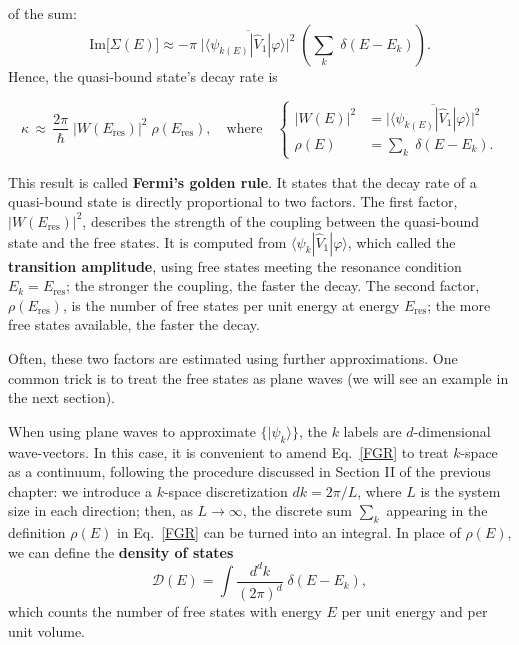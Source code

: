 \documentclass[pra,12pt]{revtex4}
\begin{document}
of the sum:
\begin{equation}
  \mathrm{Im}\big[\Sigma(E)\big]
  \approx - \pi \;
  \overline{\big| \langle\psi_{k(E)}| \hat{V}_1|\varphi\rangle\big|^2}
  \; \left( \sum_k \; \delta(E-E_k) \right).
  \label{fermigr2}
\end{equation}
Hence, the quasi-bound state's decay rate is
\begin{framed}
  \begin{equation}
    \kappa
    \,\approx\, \frac{2\pi}{\hbar} \;
    \big|W(E_\mathrm{res})\big|^2 \; \rho(E_{\mathrm{res}}),
    \quad \mathrm{where} \quad \left\{
    \begin{aligned}
      \big|W(E)\big|^2
      &= \overline{\Big| \langle\psi_{k(E)}| \hat{V}_1|\varphi\rangle\Big|^2} \\
      \rho(E) &= \sum_k \; \delta(E-E_k).
    \end{aligned}\right.
    \label{FGR}
  \end{equation}
\end{framed}
\vskip -0.12in
This result is called \textbf{Fermi's golden rule}.  It states that
the decay rate of a quasi-bound state is directly proportional to two
factors.  The first factor, $|W(E_\mathrm{res})|^2$, describes the
strength of the coupling between the quasi-bound state and the free
states.  It is computed from $\langle\psi_{k}|
\hat{V}_1|\varphi\rangle$, which called the \textbf{transition
  amplitude}, using free states meeting the resonance condition $E_k =
E_{\mathrm{res}}$; the stronger the coupling, the faster the decay.
The second factor, $\rho(E_{\mathrm{res}})$, is the number of free
states per unit energy at energy $E_{\mathrm{res}}$; the more free
states available, the faster the decay.

Often, these two factors are estimated using further approximations.
One common trick is to treat the free states as plane waves (we will
see an example in the next section).

When using plane waves to approximate $\{|\psi_k\rangle\}$, the $k$
labels are $d$-dimensional wave-vectors.  In this case, it is
convenient to amend Eq.~\eqref{FGR} to treat $k$-space as a continuum,
following the procedure discussed in Section II of the previous
chapter: we introduce a $k$-space discretization $dk = 2\pi/L$, where
$L$ is the system size in each direction; then, as $L\rightarrow
\infty$, the discrete sum $\sum_k$ appearing in the definition
$\rho(E)$ in Eq.~\eqref{FGR} can be turned into an integral.  In place
of $\rho(E)$, we can define the \textbf{density of states}
\begin{equation}
  \mathcal{D}(E) = \int \frac{d^d k}{(2\pi)^d} \; \delta(E - E_k),
\end{equation}
which counts the number of free states with energy $E$ per unit energy
and per unit volume.
\end{document}
